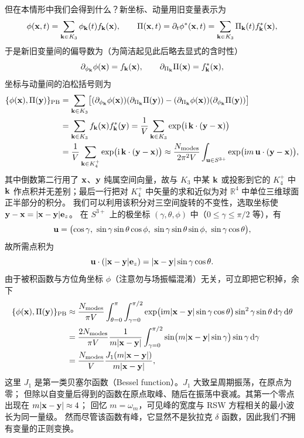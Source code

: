但在本情形中我们会得到什么？新坐标、动量用旧变量表示为
\begin{equation*}
\phi(\mathbf{x},t)=\sum_{\mathbf{k}\in K_{3}}\phi_{\mathbf{k}}(t)f_{\mathbf{k}}(\mathbf{x}),\qquad
\Pi(\mathbf{x},t)=\partial_{t}\phi^{*}(\mathbf{x},t)
=\sum_{\mathbf{k}\in K_{3}}\Pi_{\mathbf{k}}(t)f^{*}_{\mathbf{k}}(\mathbf{x}),
\end{equation*}
于是新旧变量间的偏导数为（为简洁起见此后略去显式的含时性）
\begin{equation*}
\partial_{\phi_{\mathbf{k}}}\phi(\mathbf{x})=f_{\mathbf{k}}(\mathbf{x}),\qquad
\partial_{\Pi_{\mathbf{k}}}\Pi(\mathbf{x})=f^{*}_{\mathbf{k}}(\mathbf{x}),
\end{equation*}
坐标与动量间的泊松括号则为
\begin{align*}
\{\phi(\mathbf{x}),\Pi(\mathbf{y})\}_{\text{PB}}
&=\sum_{\mathbf{k}\in K_{3}}\bigl[(\partial_{\phi_{\mathbf{k}}}\phi(\mathbf{x}))(\partial_{\Pi_{\mathbf{k}}}\Pi(\mathbf{y}))
-(\partial_{\Pi_{\mathbf{k}}}\phi(\mathbf{x}))(\partial_{\phi_{\mathbf{k}}}\Pi(\mathbf{y}))\bigr]\\
&=\sum_{\mathbf{k}\in K_{3}}f_{\mathbf{k}}(\mathbf{x})f^{*}_{\mathbf{k}}(\mathbf{y})
=\frac{1}{V}\sum_{\mathbf{k}\in K_{3}}\exp\bigl(\mathrm{i}\,\mathbf{k}\cdot(\mathbf{y}-\mathbf{x})\bigr)\\
&=\frac{1}{V}\sum_{\mathbf{k}\in K_{4}^{+}}\exp\bigl(\mathrm{i}\,\mathbf{k}\cdot(\mathbf{y}-\mathbf{x})\bigr)
\approx\frac{N_{\text{modes}}}{2\pi^{2}V}\int_{\mathbf{u}\in S^{3+}}\exp\bigl(\mathrm{i} m\,\mathbf{u}\cdot(\mathbf{y}-\mathbf{x})\bigr),
\end{align*}
其中倒数第二行用了 $\mathbf{x}$、$\mathbf{y}$ 纯属空间向量，故与 $K_{3}$ 中某 $\mathbf{k}$ 或投影到它的 $K_{4}^{+}$ 中 $\mathbf{k}$
作点积并无差别；最后一行把对 $K_{4}^{+}$ 中矢量的求和近似为对 $\mathbb{R}^{4}$ 中单位三维球面正半部分的积分。
我们可以利用该积分对三空间旋转的不变性，选取坐标使 $\mathbf{y}-\mathbf{x}=|\mathbf{x}-\mathbf{y}|\mathbf{e}_{z}$。
在 $S^{3+}$ 上的极坐标 $(\gamma,\theta,\phi)$ 中（$0\le\gamma\le\pi/2$ 等），有
\begin{equation*}
\bu=\bigl(\cos\gamma,\ \sin\gamma\sin\theta\cos\phi,\ \sin\gamma\sin\theta\sin\phi,\ \sin\gamma\cos\theta\bigr),
\end{equation*}
故所需点积为
\begin{equation*}
\mathbf{u}\cdot(|\mathbf{x}-\mathbf{y}|\mathbf{e}_{z})=|\mathbf{x}-\mathbf{y}|\sin\gamma\cos\theta .
\end{equation*}
由于被积函数与方位角坐标 $\phi$（注意勿与场振幅混淆）无关，可立即把它积掉，余下
\begin{align*}
\{\phi(\mathbf{x}),\Pi(\mathbf{y})\}_{\text{PB}}
&\approx\frac{N_{\text{modes}}}{\pi V}
\int_{\theta=0}^{\pi}\int_{\gamma=0}^{\pi/2}
\exp\bigl(\mathrm{i} m|\mathbf{x}-\mathbf{y}|\sin\gamma\cos\theta\bigr)\sin^{2}\gamma\sin\theta\,\mathrm{d}\gamma\,\mathrm{d}\theta\\
&=\frac{2N_{\text{modes}}}{\pi V}\frac{1}{m|\mathbf{x}-\mathbf{y}|}
\int_{\gamma=0}^{\pi/2}\sin\bigl(m|\mathbf{x}-\mathbf{y}|\sin\gamma\bigr)\sin\gamma\,\mathrm{d}\gamma\\
&=\frac{N_{\text{modes}}}{V}\frac{J_{1}(m|\mathbf{x}-\mathbf{y}|)}{m|\mathbf{x}-\mathbf{y}|},
\end{align*}
这里 $J_{1}$ 是第一类贝塞尔函数（Bessel function）。$J_{1}$ 大致呈周期振荡，在原点为零；
但除以自变量后得到的函数在原点取峰、随后在振荡中衰减。其第一个零点出现在 $m|\mathbf{x}-\mathbf{y}|\approx 4$；
回忆 $m=\omega_{m}$，可见峰的宽度与 RSW 方程相关的最小波长为同一量级。
然而尽管该函数有峰，它显然不是狄拉克 $\delta$ 函数，因此我们\emph{不}拥有变量的正则变换。

